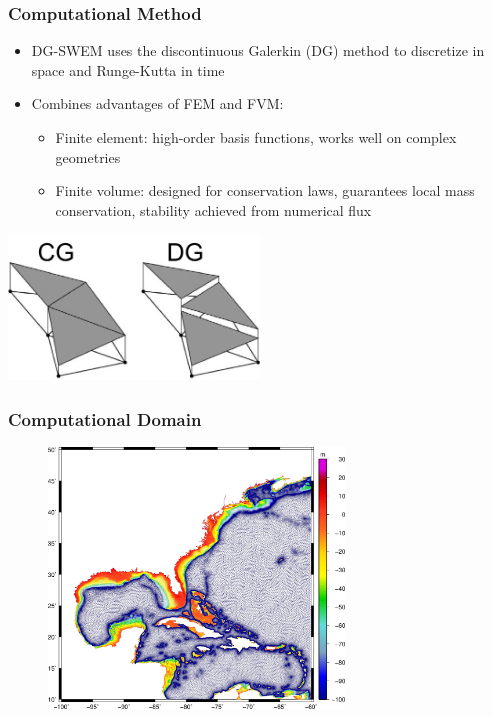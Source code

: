 \documentclass[10pt]{beamer}
\begin{document}
\begin{frame}
  \frametitle{Computational Method}
  \begin{itemize}
  \item DG-SWEM uses the discontinuous Galerkin (DG) method to discretize in space and Runge-Kutta in time
  \item Combines advantages of FEM and FVM:
    \begin{itemize}
    \item Finite element: high-order basis functions, works well on complex geometries
    \item Finite volume: designed for conservation laws, guarantees local mass conservation, stability achieved from numerical flux
    \end{itemize}
  \end{itemize}
  \includegraphics[width=0.5\textwidth]{cgdg.jpg}
\end{frame}
\begin{frame}
  \frametitle{Computational Domain}
  \begin{figure}[t]
    \centering
    \includegraphics[width=0.7\textwidth]{120m_bath.jpg}
  \end{figure}
\end{frame}
\end{document}
